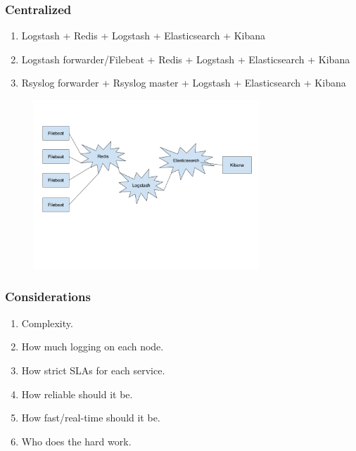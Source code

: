 \documentclass[13pt, ignorenonframetext]{beamer}
\begin{document}
\begin{frame}
\frametitle{Centralized}
\begin{enumerate}
    \item Logstash + Redis + Logstash + Elasticsearch + Kibana
    \item Logstash forwarder/Filebeat + Redis + Logstash + Elasticsearch + Kibana
    \item Rsyslog forwarder + Rsyslog master + Logstash + Elasticsearch + Kibana
\end{enumerate}
\begin{figure}
\centering
\includegraphics[width=8.5cm]{images/centralized-elk.png}
\end{figure}

\end{frame}


\begin{frame}
\frametitle{Considerations}
\begin{enumerate}
    \item Complexity.
    \item How much logging on each node.
    \item How strict SLAs for each service.
    \item How reliable should it be.
    \item How fast/real-time should it be.
    \item Who does the hard work.
\end{enumerate}
\end{frame}
\end{document}
